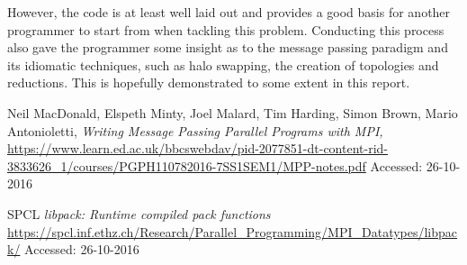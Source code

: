 \documentclass[a4paper,12pt]{article}
\begin{document}
However, the code is at least well laid out and provides a good basis for another programmer to start from when tackling this problem. Conducting this process also gave the programmer some insight as to the message passing paradigm and its idiomatic techniques, such as halo swapping, the creation of topologies and reductions. This is hopefully demonstrated to some extent in this report.


\begin{thebibliography}{}
Neil MacDonald, Elspeth Minty, Joel Malard, Tim Harding, Simon Brown, Mario Antonioletti,
\textit{Writing Message Passing Parallel Programs with MPI,}
\url{https://www.learn.ed.ac.uk/bbcswebdav/pid-2077851-dt-content-rid-3833626_1/courses/PGPH110782016-7SS1SEM1/MPP-notes.pdf}
Accessed: 26-10-2016

SPCL
\textit{libpack: Runtime compiled pack functions}
\url{https://spcl.inf.ethz.ch/Research/Parallel_Programming/MPI_Datatypes/libpack/}
Accessed: 26-10-2016

\end{thebibliography}

\pagebreak
\pagebreak
\end{document}
